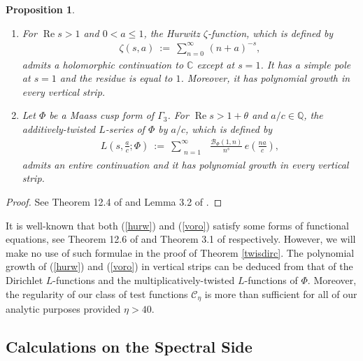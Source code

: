 \documentclass[11pt,reqno]{amsart}
\newtheorem{prop}[thm]{Proposition}
\theoremstyle{definition}
\theoremstyle{definition}
\theoremstyle{remark}
\newcommand{\C}{\ensuremath{\mathbb{C}}}
\newcommand{\Q}{\mathbb{Q}}
\numberwithin{equation}{section}
\DeclareMathOperator{\re}{Re}
\begin{document}
 \begin{prop}\label{simpvor}
	\
	\begin{enumerate}
		\item 	For $\re s>1$  and  $0<a\le 1$,  the Hurwitz $\zeta$-function, which is defined by 
		\begin{align}\label{hurw}
			\zeta(s, a) \ := \ \sum_{n=0}^{\infty} \, (n+a)^{-s}, 
		\end{align}
		admits a holomorphic continuation to $\C$ except at $s=1$. It has  a simple pole at $s=1$ and the residue is equal to  $1$. Moreover, it has polynomial growth in every vertical strip. 
		
		
		\item Let $\Phi$ be a Maass cusp form of $\Gamma_{3}$. For $\re s>1+\theta$ and $a/c\in \Q$, the additively-twisted $L$-series of $\Phi$ by $a/c$, which is defined by
		\begin{align}\label{voro}
			L\left( s, \frac{a}{c}; \Phi\right) \ := \  \sum_{\substack{n=1} }^{\infty} \    \  \frac{\mathcal{B}_{\Phi}(1, n)}{ n^{s}} \,   e\left( \frac{na}{c}\right),
		\end{align}
		admits an entire continuation and it has polynomial growth in every vertical strip. 
	\end{enumerate}
\end{prop}

\begin{proof}
	See Theorem 12.4 of  \cite{Ap76} and Lemma 3.2 of  \cite{GL06}. 
\end{proof}


	It is well-known that both  (\ref{hurw}) and (\ref{voro}) satisfy some forms of  functional equations, see Theorem 12.6 of \cite{Ap76} and  Theorem 3.1 of \cite{GL06} respectively.   However, we will make no use of such formulae in the proof of Theorem \ref{twisdirc}. The  polynomial growth of  (\ref{hurw}) and (\ref{voro}) in vertical strips can be deduced from that of the Dirichlet $L$-functions and the multiplicatively-twisted $L$-functions of $\Phi$. Moreover, the regularity of our class of test functions  $\mathcal{C}_{\eta}$ is more than sufficient for all of our analytic purposes provided $\eta> 40$. 





		
		
		\subsection{Calculations on the Spectral Side}
		
\end{document}
